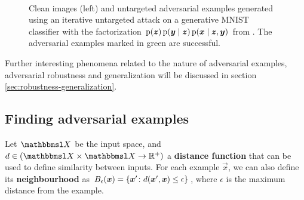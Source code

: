 \documentclass[twocolumn]{article}
\begin{document}
\begin{figure}
	\begin{center}
		\
	\end{center}
	\caption{Clean images (left) and untargeted adversarial examples generated using an iterative untargeted attack on a generative MNIST \citep{LeCun:2015:DL} classifier with the factorization $\p(\vec z)\p(\vec y\mid\vec z)\p(\vec x\mid\vec z,\vec y)$ from \citet{Li:2019:AGCMRAA}. The adversarial examples marked in green are successful.}
	\label{fig:li-gfz-adversarial-examples-mnist}
\end{figure}

Further interesting phenomena related to the nature of adversarial examples, adversarial robustness and generalization will be discussed in section \ref{sec:robustness-generalization}.


\subsection{Finding adversarial examples} \label{sec:finding-adversarial-examples}

Let $\set X$ be the input space,
and $d\in(\set X\times\set X\to \R^+)$ a \textbf{distance function} that can be used to define similarity between inputs. 
For each example $\vec x$, 
we can also define its \textbf{neighbourhood} as $B_{\epsilon}(\vec x) = \cbr{\vec x'\colon d(\vec x', \vec x) \leq \epsilon}$,
where $\epsilon$ is the maximum distance from the example.
\end{document}
